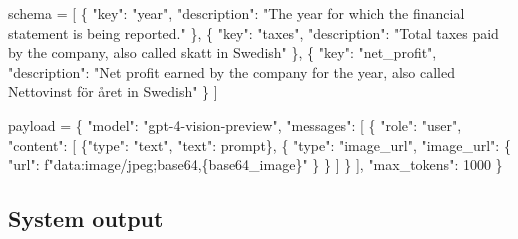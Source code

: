 \documentclass[
  letterpaper,
  DIV=11,
  numbers=noendperiod]{scrartcl}
\newenvironment{Shaded}{\begin{snugshade}}{\end{snugshade}}
\newcommand{\DecValTok}[1]{\textcolor[rgb]{0.68,0.00,0.00}{#1}}
\newcommand{\NormalTok}[1]{\textcolor[rgb]{0.00,0.23,0.31}{#1}}
\newcommand{\OperatorTok}[1]{\textcolor[rgb]{0.37,0.37,0.37}{#1}}
\newcommand{\SpecialCharTok}[1]{\textcolor[rgb]{0.37,0.37,0.37}{#1}}
\newcommand{\SpecialStringTok}[1]{\textcolor[rgb]{0.13,0.47,0.30}{#1}}
\newcommand{\StringTok}[1]{\textcolor[rgb]{0.13,0.47,0.30}{#1}}
\begin{document}
\begin{Shaded}
\begin{Highlighting}[]
\NormalTok{schema }\OperatorTok{=}\NormalTok{ [}
\NormalTok{        \{}
            \StringTok{"key"}\NormalTok{: }\StringTok{"year"}\NormalTok{,}
            \StringTok{"description"}\NormalTok{: }\StringTok{"The year for which the financial statement is being reported."}
\NormalTok{        \},}
\NormalTok{        \{}
            \StringTok{"key"}\NormalTok{: }\StringTok{"taxes"}\NormalTok{,}
            \StringTok{"description"}\NormalTok{: }\StringTok{"Total taxes paid by the company, also called \textquotesingle{}skatt\textquotesingle{} in Swedish"}
\NormalTok{        \},}
\NormalTok{        \{}
            \StringTok{"key"}\NormalTok{: }\StringTok{"net\_profit"}\NormalTok{,}
            \StringTok{"description"}\NormalTok{: }\StringTok{"Net profit earned by the company for the year, also called \textquotesingle{}Nettovinst för året\textquotesingle{} in Swedish"}
\NormalTok{        \}}
\NormalTok{]}

\NormalTok{payload }\OperatorTok{=}\NormalTok{ \{}
    \StringTok{"model"}\NormalTok{: }\StringTok{"gpt{-}4{-}vision{-}preview"}\NormalTok{,}
    \StringTok{"messages"}\NormalTok{: [}
\NormalTok{    \{}
        \StringTok{"role"}\NormalTok{: }\StringTok{"user"}\NormalTok{,}
        \StringTok{"content"}\NormalTok{: [}
\NormalTok{        \{}\StringTok{"type"}\NormalTok{: }\StringTok{"text"}\NormalTok{, }\StringTok{"text"}\NormalTok{: prompt\},}
\NormalTok{        \{}
            \StringTok{"type"}\NormalTok{: }\StringTok{"image\_url"}\NormalTok{,}
            \StringTok{"image\_url"}\NormalTok{: \{}
            \StringTok{"url"}\NormalTok{: }\SpecialStringTok{f"data:image/jpeg;base64,}\SpecialCharTok{\{}\NormalTok{base64\_image}\SpecialCharTok{\}}\SpecialStringTok{"}
\NormalTok{            \}}
\NormalTok{        \}}
\NormalTok{        ]}
\NormalTok{    \}}
\NormalTok{    ],}
    \StringTok{"max\_tokens"}\NormalTok{: }\DecValTok{1000}
\NormalTok{\}}
\end{Highlighting}
\end{Shaded}

\hypertarget{system-output}{%
\subsection{System output}\label{system-output}}
\end{document}
